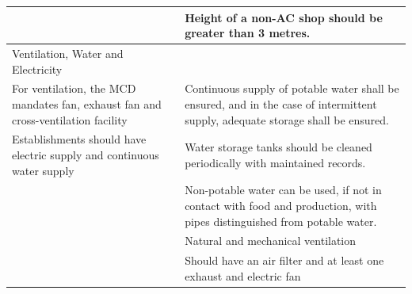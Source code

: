 \documentclass[a4paper, 12pt]{article}
\newcommand\tabitem{\makebox[1em][r]{\textbullet~}}
\begin{document}
\begin{longtable}{>{\raggedright}p{6.5cm}>{\raggedright\arraybackslash}p{8.5cm}}
		&	 \newline{} \tabitem Height of a non-AC shop should be greater than 3 metres.\\
    \midrule
  Ventilation, Water and Electricity	&	\\
    \midrule
 \tabitem   For ventilation, the MCD mandates fan, exhaust fan and cross-ventilation facility	&	 
 \tabitem Continuous supply of potable water shall be ensured, and in the case of intermittent supply, adequate storage shall be ensured.\\
\newline{} \tabitem Establishments should have electric supply and continuous water supply	&	\newline{} \tabitem Water storage tanks should be cleaned periodically with maintained records.\\
	&	\newline{} \tabitem Non-potable water can be used, if not in contact with food and production, with pipes distinguished from potable water.\\
	&	\newline{} \tabitem Natural and mechanical ventilation\\
	&	\newline{} \tabitem Should have an air filter and at least one exhaust and electric fan\\
\midrule
    

\end{longtable}
\end{document}
